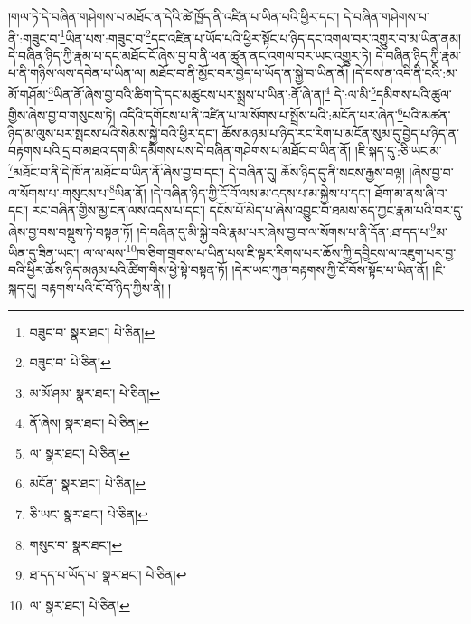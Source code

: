 །གལ་ཏེ་དེ་བཞིན་གཤེགས་པ་མཐོང་ན་དེའི་ཚེ་ཁྱོད་ནི་འཛིན་པ་ཡིན་པའི་ཕྱིར་དང་། དེ་བཞིན་གཤེགས་པ་ནི་:གཟུང་བ་\footnote{བཟུང་བ་  སྣར་ཐང་།  པེ་ཅིན། }ཡིན་པས་:གཟུང་བ་\footnote{བཟུང་བ་  པེ་ཅིན། }དང་འཛིན་པ་ཡོད་པའི་ཕྱིར་སྟོང་པ་ཉིད་དང་འགལ་བར་འགྱུར་བ་མ་ཡིན་ནམ། དེ་བཞིན་ཉིད་ཀྱི་རྣམ་པ་དང་མཐོང་ངོ་ཞེས་བྱ་བ་ནི་ཕན་ཚུན་ནང་འགལ་བར་ཡང་འགྱུར་ཏེ། དེ་བཞིན་ཉིད་ཀྱི་རྣམ་པ་ནི་གཉིས་ལས་དབེན་པ་ཡིན་ལ། མཐོང་བ་ནི་མྱོང་བར་བྱེད་པ་ཡོད་ན་སྐྱེ་བ་ཡིན་ནོ། །དེ་བས་ན་འདི་ནི་ངའི་:མ་མོ་གཤོམ་\footnote{མ་མོ་ཤམ་  སྣར་ཐང་།  པེ་ཅིན། }ཡིན་ནོ་ཞེས་བྱ་བའི་ཚིག་དེ་དང་མཚུངས་པར་སྨྲས་པ་ཡིན་:ནོ་ཞེ་ན།\footnote{ནོ་ཞེས།  སྣར་ཐང་།  པེ་ཅིན། } དེ་:ལ་མི་\footnote{ལ་  སྣར་ཐང་།  པེ་ཅིན། }དམིགས་པའི་ཚུལ་གྱིས་ཞེས་བྱ་བ་གསུངས་ཏེ། འདིའི་དགོངས་པ་ནི་འཛིན་པ་ལ་སོགས་པ་སྤྲོས་པའི་:མངོན་པར་ཞེན་\footnote{མངོན་  སྣར་ཐང་།  པེ་ཅིན། }པའི་མཚན་ཉིད་མ་ལུས་པར་སྤངས་པའི་སེམས་སྐྱེ་བའི་ཕྱིར་དང་། ཆོས་མཉམ་པ་ཉིད་རང་རིག་པ་མངོན་སུམ་དུ་བྱེད་པ་ཉིད་ན་བརྟགས་པའི་དྲ་བ་མཐའ་དག་མི་དམིགས་པས་དེ་བཞིན་གཤེགས་པ་མཐོང་བ་ཡིན་ནོ། །ཇི་སྐད་དུ་:ཅི་ཡང་མ་\footnote{ཅི་ཡང་  སྣར་ཐང་།  པེ་ཅིན། }མཐོང་བ་ནི་དེ་ཁོ་ན་མཐོང་བ་ཡིན་ནོ་ཞེས་བྱ་བ་དང་། དེ་བཞིན་དུ། ཆོས་ཉིད་དུ་ནི་སངས་རྒྱས་བལྟ། །ཞེས་བྱ་བ་ལ་སོགས་པ་:གསུངས་པ་\footnote{གསུང་བ་  སྣར་ཐང་། }ཡིན་ནོ། །དེ་བཞིན་ཉིད་ཀྱི་ངོ་བོ་ལས་མ་འདས་པ་མ་སྐྱེས་པ་དང་། ཐོག་མ་ནས་ཞི་བ་དང་། རང་བཞིན་གྱིས་མྱ་ངན་ལས་འདས་པ་དང་། དངོས་པོ་མེད་པ་ཞེས་འབྱུང་བ་ཐམས་ཅད་ཀྱང་རྣམ་པའི་བར་དུ་ཞེས་བྱ་བས་བསྡུས་ཏེ་བསྟན་ཏོ། །དེ་བཞིན་དུ་མི་སྐྱེ་བའི་རྣམ་པར་ཞེས་བྱ་བ་ལ་སོགས་པ་ནི་དོན་:ཐ་དད་པ་\footnote{ཐ་དད་པ་ཡོད་པ་  སྣར་ཐང་།  པེ་ཅིན། }མ་ཡིན་དུ་ཟིན་ཡང་། ལ་ལ་ལས་\footnote{ལ་  སྣར་ཐང་།  པེ་ཅིན། }ཁ་ཅིག་གྲགས་པ་ཡིན་པས་ཇི་ལྟར་རིགས་པར་ཆོས་ཀྱི་དབྱིངས་ལ་འཇུག་པར་བྱ་བའི་ཕྱིར་ཆོས་ཉིད་མཉམ་པའི་ཚིག་གིས་ཕྱེ་སྟེ་བསྟན་ཏོ། །དེར་ཡང་ཀུན་བརྟགས་ཀྱི་ངོ་བོས་སྟོང་པ་ཡིན་ནོ། །ཇི་སྐད་དུ། བརྟགས་པའི་ངོ་བོ་ཉིད་ཀྱིས་ནི། །
